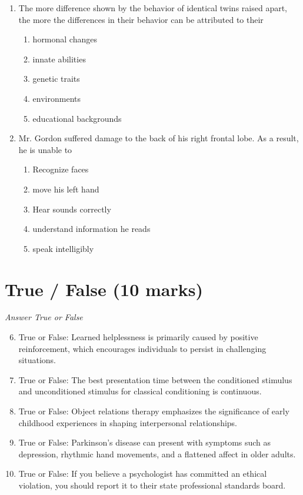 \documentclass[12pt]{article}
\begin{document}
\begin{enumerate}[label=\arabic*.]
\item The more difference shown by the behavior of identical twins raised apart, the more the differences in their behavior can be attributed to their
\begin{enumerate}[label=(\alph*)]
    \item hormonal changes
    \item innate abilities
    \item genetic traits
    \item environments
    \item educational backgrounds
\end{enumerate}
\item Mr. Gordon suffered damage to the back of his right frontal lobe. As a result, he is unable to
\begin{enumerate}[label=(\alph*)]
    \item Recognize faces
    \item move his left hand
    \item Hear sounds correctly
    \item understand information he reads
    \item speak intelligibly
\end{enumerate}
\end{enumerate}

\section*{True / False (10 marks)}
\textit{Answer True or False}
\begin{enumerate}[label=\arabic*.]
\setcounter{enumi}{5}
\item True or False: Learned helplessness is primarily caused by positive reinforcement, which encourages individuals to persist in challenging situations.
\item True or False: The best presentation time between the conditioned stimulus and unconditioned stimulus for classical conditioning is continuous.
\item True or False: Object relations therapy emphasizes the significance of early childhood experiences in shaping interpersonal relationships.
\item True or False: Parkinson's disease can present with symptoms such as depression, rhythmic hand movements, and a flattened affect in older adults.
\item True or False: If you believe a psychologist has committed an ethical violation, you should report it to their state professional standards board.
\end{enumerate}
\end{document}
